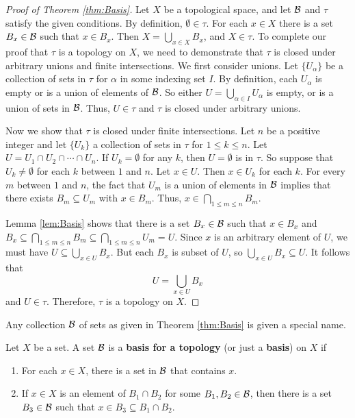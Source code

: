 \begin{proof}[Proof of Theorem  \ref{thm:Basis}] Let $X$ be a topological space, and let $\mathcal{B}$ and $\tau$ satisfy the given conditions. By definition, $\emptyset \in \tau$. For each $x \in X$ there is a set $B_x \in \mathcal{B}$ such that $x \in B_x$. Then $X = \bigcup_{x \in X} B_x$, and $X \in \tau$. To complete our proof that $\tau$ is a topology on $X$, we need to demonstrate that $\tau$ is closed under arbitrary unions and finite intersections. We first consider unions. Let $\{U_{\alpha}\}$ be a collection of sets in $\tau$ for $\alpha$ in some indexing set $I$. By definition, each $U_{\alpha}$ is empty or is a union of elements of $\mathcal{B}$. So either $U = \bigcup_{\alpha \in I} U_{\alpha}$ is empty, or is a union of sets in $\mathcal{B}$. Thus, $U \in \tau$ and $\tau$ is closed under arbitrary unions. 

Now we show that $\tau$ is closed under finite intersections. Let $n$ be a positive integer and let $\{U_{k}\}$ a collection of sets in $\tau$ for $1 \leq k \leq n$. Let $U = U_1 \cap U_2 \cap \cdots \cap U_n$. If $U_k = \emptyset$ for any $k$, then $U = \emptyset$ is in $\tau$. So suppose that $U_k \neq \emptyset$ for each $k$ between $1$ and $n$. Let $x \in U$. Then $x \in U_k$ for each $k$. For every $m$ between $1$ and $n$, the fact that $U_m$ is a union of elements in $\mathcal{B}$ implies that there exists $B_m \subseteq U_m$ with $x \in B_m$. Thus, $x \in \bigcap_{1 \leq m \leq n} B_m$. 

Lemma \ref{lem:Basis} shows that there is a set $B_x \in \mathcal{B}$ such that $x \in B_x$ and $B_x \subseteq \bigcap_{1 \leq m \leq n} B_m \subseteq \bigcap_{1 \leq m \leq n} U_m = U$. Since $x$ is an arbitrary element of $U$, we must have $U \subseteq \bigcup_{x \in U} B_x$. But each $B_x$ is subset of $U$, so $\bigcup_{x \in U} B_x \subseteq U$. It follows that 
\[U = \bigcup_{x \in U} B_x\]
and $U \in \tau$. Therefore, $ \tau$ is a topology on $X$.
\end{proof}

Any collection $\mathcal{B}$ of sets as given in Theorem \ref{thm:Basis} is given a special name.

\begin{definition} \label{def:basis_topology} Let $X$ be a set. A set $\mathcal{B}$ is a \textbf{basis for a topology} (or just a \textbf{basis}) on $X$ if 
\begin{enumerate}
\item For each $x \in X$, there is a set in $\mathcal{B}$ that contains $x$.
\item If $x \in X$ is an element of $B_1 \cap B_2$ for some $B_1, B_2 \in \mathcal{B}$, then there is a set $B_3 \in \mathcal{B}$ such that $x \in B_3 \subseteq B_1 \cap B_2$. 
\end{enumerate}
\end{definition}

